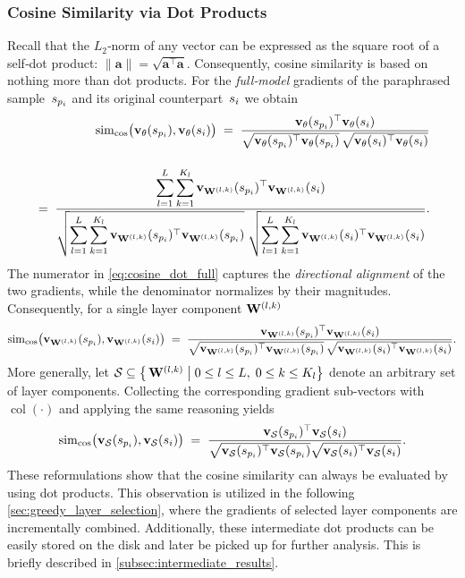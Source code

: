 \subsubsection{Cosine Similarity via Dot Products}
Recall that the $L_2$‑norm of any vector can be expressed as the square root of a self‑dot product:
$\|\mathbf{a}\|=\sqrt{\mathbf{a}^{\top}\mathbf{a}}$.
Consequently, cosine similarity is based on nothing more than dot products. For the \emph{full‑model} gradients of the paraphrased sample~$\spi$ and its original counterpart~$\si$ we obtain
\begin{equation}
\begin{split}
      \simcos\bigl(\vXspi,\vXsi\bigr)
  \;=\;
  \frac{\vXspi^{\top}\vXsi}
       {\sqrt{\vXspi^{\top}\vXspi}\,
        \sqrt{\vXsi^{\top}\vXsi}}\\[12pt]
  \;=\;
  \frac{\displaystyle
        \sum_{l=1}^{L}\sum_{k=1}^{K_l}
        \vXspi[\Wlk]^{\top}\vXsi[\Wlk]}
       {\displaystyle
        \sqrt{\sum_{l=1}^{L}\sum_{k=1}^{K_l}
               \vXspi[\Wlk]^{\top}\vXspi[\Wlk]}\;
        \sqrt{\sum_{l=1}^{L}\sum_{k=1}^{K_l}
               \vXsi[\Wlk]^{\top}\vXsi[\Wlk]}}.
\end{split}
\label{eq:cosine_dot_full}
\end{equation}
The numerator in \autoref{eq:cosine_dot_full} captures the \emph{directional alignment} of the two gradients, while the denominator normalizes by their magnitudes. Consequently, for a single layer component $\Wlk$
\begin{equation}
  \simcos\bigl(\vXspi[\Wlk],\vXsi[\Wlk]\bigr)
  \;=\;
  \frac{\vXspi[\Wlk]^{\top}\vXsi[\Wlk]}
       {\sqrt{\vXspi[\Wlk]^{\top}\vXspi[\Wlk]}\,
        \sqrt{\vXsi[\Wlk]^{\top}\vXsi[\Wlk]}}.
  \label{eq:cosine_dot_layer}
\end{equation}
More generally, let $\mathcal{S}\subseteq \bigl\{\,\Wlk \;\big|\;0\le l\le L,\;0\le k\le K_l\bigr\}$ denote an arbitrary set of layer components. Collecting the corresponding gradient sub-vectors with
$\operatorname{col}(\cdot)$ and applying the same reasoning yields
\begin{equation}
  \simcos\bigl(\vXspi[\mathcal{S}],\vXsi[\mathcal{S}]\bigr)
  \;=\;
  \frac{\vXspi[\mathcal{S}]^{\top}\vXsi[\mathcal{S}]}
       {\sqrt{\vXspi[\mathcal{S}]^{\top}\vXspi[\mathcal{S}]}
        \sqrt{\vXsi[\mathcal{S}]^{\top}\vXsi[\mathcal{S}]}}.
  \label{eq:cosine_dot_subset}
\end{equation}
These reformulations show that the cosine similarity can always be evaluated by using dot products. This observation is utilized in the following \autoref{sec:greedy_layer_selection}, where the gradients of selected layer components are incrementally combined. Additionally, these intermediate dot products can be easily stored on the disk and later be picked up for further analysis. This is briefly described in \autoref{subsec:intermediate_results}.

